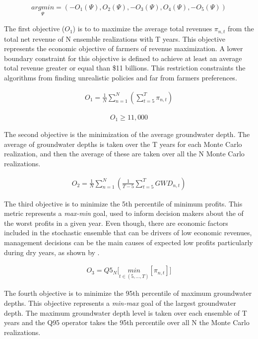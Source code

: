 \documentclass[11pt,a4paper]{article}
\begin{document}
\begin{align}
\underset{\Psi}{argmin} = (-O_{1}(\Psi),O_{2}(\Psi),-O_{3}(\Psi),O_{4}(\Psi),-O_{5}(\Psi))
\end{align}

The first objective ($O_{1}$) is to to maximize the average total revenues $\pi_{n,t}$ from the total net revenue of N ensemble realizations with T years. This objective represents the economic objective of farmers of revenue maximization. A lower boundary constraint for this objective is defined to achieve at least an average total revenue greater or equal than \$11 billions. This restriction constraints the algorithms from finding unrealistic policies and far from farmers preferences. 

\begin{align}
O_{1} = \frac{1}{N}\sum_{n=1}^N(\sum_{t=5}^T \pi_{n,t})
\end{align}


\begin{align}
O_{1} \geq 11,000
\end{align}

The second objective is the minimization of the average groundwater depth. The average of groundwater depths is taken over the T years for each Monte Carlo realization, and then the average of these are taken over all the N Monte Carlo realizations. 

\begin{align}
O_{2} = \frac{1}{N}\sum_{n=1}^N(\frac{1}{T-5}\sum_{t=5}^T GWD_{n,t})
\end{align}

The third objective is to minimize the 5th percentile of minimum profits. This metric represents a \textit{max-min} goal, used to inform decision makers about the of the worst profits in a given year. Even though, there are economic factors included in the stochastic ensemble that can be drivers of low economic revenues, management decisions can be the main causes of expected low profits particularly during dry years, as shown by \textcite{rodriguez-flores_global_2022}. 

\begin{align}
O_{3} = Q5_{N} \bigg[\underset{t\in(5,...,T)}{min}[\pi_{n,t}]\bigg]
\end{align}

The fourth objective is to minimize the 95th percentile of maximum groundwater depths. This objective represents a \textit{min-max} goal of the largest groundwater depth.  The maximum groundwater depth level is taken over each ensemble of T years and the Q95 operator takes the 95th percentile over all N the Monte Carlo  realizations. 
\end{document}
